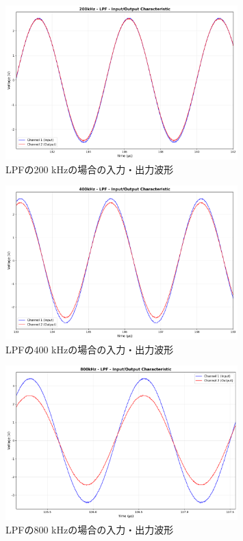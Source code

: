 \documentclass[11pt,dvipdfmx]{jarticle}
\begin{document}
\begin{figure}[H]
  \centering
  \includegraphics[width=0.8\textwidth]{graphs/200kHz_LPF_characteristic.png}
  \caption{LPFの200 kHzの場合の入力・出力波形}
  \label{fig:LPF_200kHz}
\end{figure}

\begin{figure}[H]
  \centering
  \includegraphics[width=0.8\textwidth]{graphs/400kHz_LPF_characteristic.png}
  \caption{LPFの400 kHzの場合の入力・出力波形}
  \label{fig:LPF_400kHz}
\end{figure}

\begin{figure}[H]
  \centering
  \includegraphics[width=0.8\textwidth]{graphs/800kHz_LPF_characteristic.png}
  \caption{LPFの800 kHzの場合の入力・出力波形}
  \label{fig:LPF_800kHz}
\end{figure}
\end{document}
